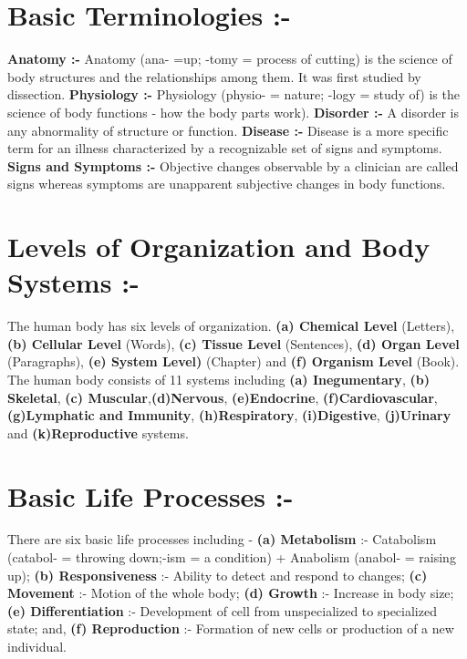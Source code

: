 \documentclass[12pt]{article}
\begin{document}
\raggedright
\begin{small}
\section{Basic Terminologies :-}
\raggedright
\textbf{Anatomy :-} Anatomy (ana- =up; -tomy = process of cutting) is the science of body structures and the relationships among them. It was first studied by dissection.
\linebreak
\textbf{Physiology :-} Physiology (physio- = nature; -logy = study of) is the science of body functions - how the body parts work).
\linebreak
\textbf{Disorder :-} A disorder is any abnormality of structure or function.
\linebreak
\textbf{Disease :-} Disease is a more specific term for an illness characterized by a recognizable set of signs and symptoms.
\linebreak
\textbf{Signs and Symptoms :-} Objective changes observable by a clinician are called signs whereas symptoms are unapparent subjective changes in body functions.

\section{Levels of Organization and Body Systems :-}
The human body has six levels of organization. \textbf{(a) Chemical Level} (Letters), \textbf{(b) Cellular Level} (Words), \textbf{(c) Tissue Level} (Sentences), \textbf{(d) Organ Level} (Paragraphs), \textbf{(e) System Level)} (Chapter) and \textbf{(f) Organism Level} (Book).
The human body consists of 11 systems including \textbf{(a) Inegumentary}, \textbf{(b) Skeletal}, \textbf{(c) Muscular},\textbf{(d)Nervous}, \textbf{(e)Endocrine}, \textbf{(f)Cardiovascular}, \textbf{(g)Lymphatic and Immunity}, \textbf{(h)Respiratory}, \textbf{(i)Digestive}, \textbf{(j)Urinary} and \textbf{(k)Reproductive} systems.

\section{Basic Life Processes :-}
There are six basic life processes including - \textbf{(a) Metabolism} :- Catabolism (catabol- =
throwing down;-ism = a condition) + Anabolism (anabol- = raising up); \textbf{(b)
Responsiveness} :- Ability to detect and respond to changes; \textbf{(c) Movement} :- Motion of the whole body; \textbf{(d) Growth} :- Increase in body size; \textbf{(e) Differentiation} :- Development of cell from unspecialized to specialized state; and, \textbf{(f) Reproduction} :- Formation of new cells or production of a new individual.


\end{small}
\end{document}
